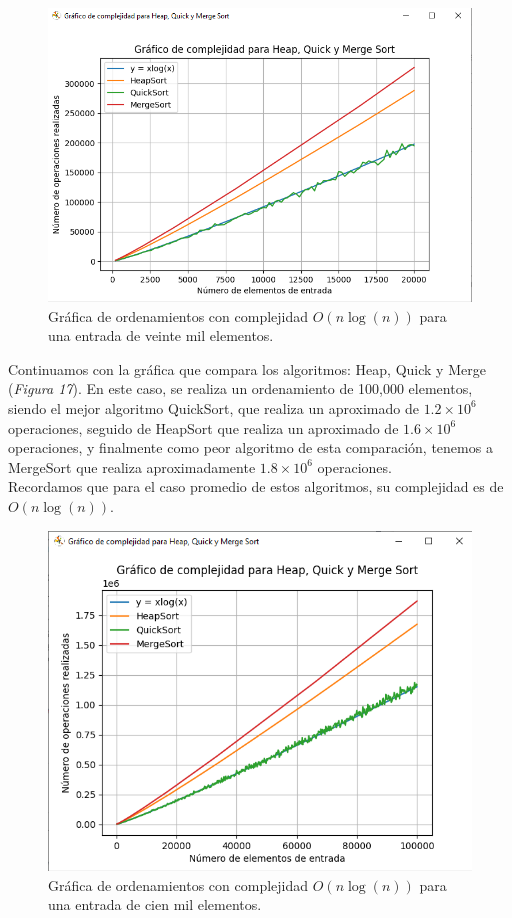 \documentclass[a4paper,12pt]{article}
\begin{document}
\begin{figure}[h]
    \centering
    \includegraphics[width=1\textwidth]{media/graficaB_20k.png}
    \caption{Gráfica de ordenamientos con complejidad $O(n\log(n))$ para una entrada de veinte mil elementos.}
    \label{fig:grafB_20k}
\end{figure}

Continuamos con la gráfica que compara los algoritmos: Heap, Quick y Merge (\textit{Figura 17}). En este caso, se realiza un ordenamiento de 100,000 elementos, siendo el mejor algoritmo QuickSort, que realiza un aproximado de $1.2 \times 10^6$ operaciones, seguido de HeapSort que realiza un aproximado de $1.6 \times 10^6$ operaciones, y finalmente como peor algoritmo de esta comparación, tenemos a MergeSort que realiza aproximadamente $1.8 \times 10^6$ operaciones.\\

Recordamos que para el caso promedio de estos algoritmos, su complejidad es de $O(n\log(n))$.\\

\begin{figure}[h]
    \centering
    \includegraphics[width=1\textwidth]{media/graficaB_100k.png}
    \caption{Gráfica de ordenamientos con complejidad $O(n\log(n))$ para una entrada de cien mil elementos.}
    \label{fig:grafB_100k}
\end{figure}
\end{document}
